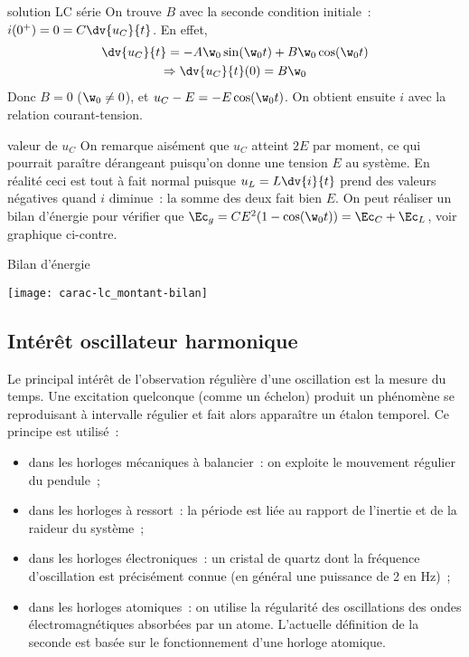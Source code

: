 \documentclass[../main/main.tex]{subfiles}
\begin{document}
\begin{tcbraster}[raster columns=2, raster equal height=rows]
\begin{demo}[label=demo:rcsolu]{solution LC série}
        On trouve $B$ avec la seconde condition initiale~: $i(0^+) = 0 = C
        \dv{u_C}{t}$. En effet,
        \begin{gather*}
            \dv{u_C}{t} = -A\w_0\sin(\w_0t) + B\w_0\cos(\w_0t)\\
            \Rightarrow \dv{u_C}{t} (0) = B\w_0
        \end{gather*}
        Donc $B = 0$ ($\w_0 \neq 0$), et $u_C - E = -E\cos(\w_0t)$. On obtient
        ensuite $i$ avec la relation courant-tension.
    \end{demo}
    \begin{rema}[label=rema:lccharge]{valeur de $u_C$}
        On remarque aisément que $u_C$ atteint $2E$ par moment, ce qui pourrait
        paraître dérangeant puisqu'on donne une tension $E$ au système. En
        réalité ceci est tout à fait normal puisque $u_L = L\dv{i}{t}$ prend des
        valeurs négatives quand $i$ diminue~: la somme des deux fait bien $E$.
        On peut réaliser un bilan d'énergie pour vérifier que $\Ec_g =
        CE^2(1-\cos(\w_0t)) = \Ec_C + \Ec_L$, voir graphique ci-contre.
    \end{rema}
    \begin{NCexem}[width=\linewidth]{Bilan d'énergie}
        \begin{center}
            \texttt{[image: carac-lc\_montant-bilan]}
        \end{center}
    \end{NCexem}
\end{tcbraster}

\subsection{Intérêt oscillateur harmonique}

Le principal intérêt de l'observation régulière d'une oscillation est la mesure
du temps. Une excitation quelconque (comme un échelon) produit un phénomène se
reproduisant à intervalle régulier et fait alors apparaître un étalon
temporel. Ce principe est utilisé~:
\begin{itemize}
    \item dans les horloges mécaniques à balancier~: on exploite le mouvement
        régulier du pendule~;
    \item dans les horloges à ressort~: la période est liée au rapport de
        l'inertie et de la raideur du système~;
    \item dans les horloges électroniques~: un cristal de quartz dont la
        fréquence d'oscillation est précisément connue (en général une puissance
        de 2 en Hz)~;
    \item dans les horloges atomiques~: on utilise la régularité des
        oscillations des ondes électromagnétiques absorbées par un atome.
        L'actuelle définition de la seconde est basée sur le fonctionnement
        d'une horloge atomique.
\end{itemize}
\end{document}
